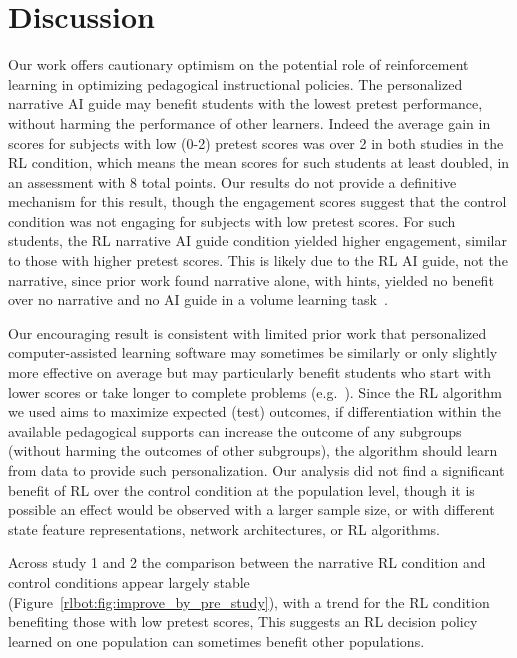 \documentclass[sn-mathphys,Numbered]{sn-jnl}%
\theoremstyle{thmstyleone}%
\theoremstyle{thmstyletwo}%
\theoremstyle{thmstylethree}%
\begin{document}
\section{Discussion}\label{sec12}

Our work offers cautionary optimism on the potential role of reinforcement learning in optimizing pedagogical instructional policies. The personalized narrative AI guide may benefit students with the lowest pretest performance, without harming the performance of other learners. Indeed the average gain in scores for subjects with low (0-2) pretest scores was over 2 in both studies in the RL condition, which means the mean scores for such students at least doubled, in an assessment with 8 total points. Our results do not provide a definitive mechanism for this result,  though the engagement scores suggest that the control condition was not engaging for subjects with low pretest scores. For such students, the RL narrative AI guide condition yielded higher engagement, similar to those with higher pretest scores. This is likely due to the RL AI guide, not the narrative, since prior work found narrative alone, with hints, yielded no benefit over no narrative and no AI guide in a volume learning task~\cite{woz}.

Our encouraging result is consistent with limited  prior work  that  personalized computer-assisted learning software may
sometimes be similarly or only slightly more effective on average but may particularly benefit students who start with lower scores or take longer to complete problems (e.g.~\cite{shen2016reinforcement, de2021students}).
Since the RL algorithm we used aims to maximize expected (test) outcomes, if differentiation within the available pedagogical supports can increase the outcome of any subgroups (without harming the outcomes of other subgroups), the algorithm should learn from data to provide such personalization.  Our analysis did not find a significant benefit of RL over the control condition at the population level, though it is possible an effect would be observed with a larger sample size, or with different state feature representations, network architectures, or RL algorithms. 

Across study 1 and 2 the comparison between the narrative RL condition and control conditions appear largely stable (Figure~\ref{rlbot:fig:improve_by_pre_study}), with a trend for the RL condition benefiting those with low pretest scores,%
This suggests an RL decision policy learned on one population can sometimes benefit other populations. 
\end{document}
